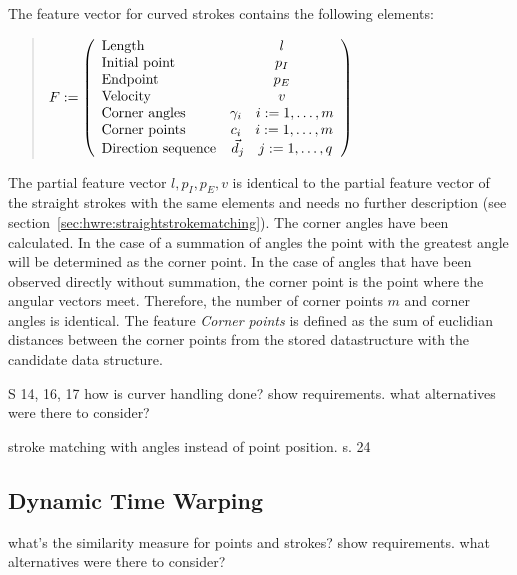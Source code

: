 The feature vector for curved strokes contains the following elements:
\begin{quote}
\(
    F :=
    \left( 
    \begin {array} {l c} 
        \text{Length} & l \\
        \text{Initial point} & p_{I} \\
        \text{Endpoint} & p_{E} \\
        \text{Velocity} & v \\
        \text{Corner angles} & \gamma_{i} \quad i := 1, \ldots , m \\
        \text{Corner points} & c_{i} \quad i := 1, \ldots , m \\
        \text{Direction sequence} & \vec{d}_j \quad j := 1, \ldots , q \\
    \end {array} 
    \right)
\)
\end{quote}
The partial feature vector \( l, p_{I}, p_{E}, v\) is identical to the partial
feature vector of the straight strokes with the same elements and needs no
further description (see section~\ref{sec:hwre:straightstrokematching}).
The corner angles have been calculated. In the case of a summation
of angles the point with the greatest angle will be determined as the 
corner point. In the case of angles that have been observed directly without 
summation, the corner point is the point where the angular vectors meet.
Therefore, the number of corner points \( m \) and corner angles is identical.
The feature \emph{Corner points} is defined as the sum of euclidian distances 
between the corner points from the stored datastructure with the candidate 
data structure.













S 14, 16, 17
how is curver handling done?
show requirements.
what alternatives were there to consider?

stroke matching with angles instead of point position.
s. 24

\subsection{Dynamic Time Warping}
\label{sec:hwre:dynamictimewarping}

what's the similarity measure for
points and strokes?
show requirements.
what alternatives were there to consider?

